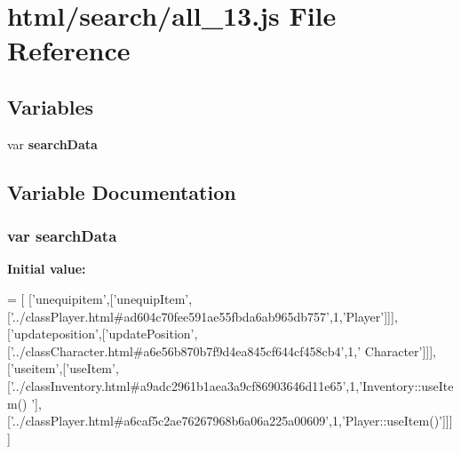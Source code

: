 \section{html/search/all\-\_\-13.js File Reference}
\label{all__13_8js}
\subsection*{Variables}
\begin{DoxyCompactItemize}
\item 
var {\bf search\-Data}
\end{DoxyCompactItemize}


\subsection{Variable Documentation}
\subsubsection[{search\-Data}]{\setlength{\rightskip}{0pt plus 5cm}var search\-Data}\label{all__13_8js_ad01a7523f103d6242ef9b0451861231e}
{\bfseries Initial value\-:}
\begin{DoxyCode}
=
[
  [\textcolor{stringliteral}{'unequipitem'},[\textcolor{stringliteral}{'unequipItem'},[\textcolor{stringliteral}{'../classPlayer.html#ad604c70fee591ae55fbda6ab965db757'},1,\textcolor{stringliteral}{'Player'}]]],
  [\textcolor{stringliteral}{'updateposition'},[\textcolor{stringliteral}{'updatePosition'},[\textcolor{stringliteral}{'../classCharacter.html#a6e56b870b7f9d4ea845cf644cf458cb4'},1,\textcolor{stringliteral}{'
      Character'}]]],
  [\textcolor{stringliteral}{'useitem'},[\textcolor{stringliteral}{'useItem'},[\textcolor{stringliteral}{'../classInventory.html#a9adc2961b1aea3a9cf86903646d11e65'},1,\textcolor{stringliteral}{'Inventory::useItem()
      '}],[\textcolor{stringliteral}{'../classPlayer.html#a6caf5c2ae76267968b6a06a225a00609'},1,\textcolor{stringliteral}{'Player::useItem()'}]]]
]
\end{DoxyCode}

